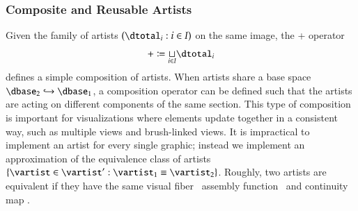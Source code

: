 \documentclass[journal]{vgtc}                %
\begin{document}
\subsubsection{Composite and Reusable Artists}
Given the family of artists $(\dtotal_i: i\in I)$ on the same image, the + operator 
\begin{equation}
+ \coloneqq \underset{i\in I}{\sqcup} \dtotal_{i}
\end{equation}
defines a simple composition of artists. When artists share a base space $\dbase_2 \hookrightarrow \dbase_1$, a composition operator can be defined such that the artists are acting on different components of the same section. This type of composition is important for visualizations where elements update together in a consistent way, such as multiple views \cite{alboRadarComparativeEvaluation2016a, hullmanKeeping2018} and brush-linked views\cite{beckerBrushingScatterplots1987,bujaInteractiveData1991}. It is impractical to implement an artist for every single graphic; instead we implement an approximation of the equivalence class of artists $\{\vartist \in \vartist^{\prime}: \vartist_{1} \equiv \vartist_{2}\}$. Roughly, two artists are equivalent if they have the same visual fiber \vfiber\, assembly function \vmark\, and continuity map \vindex. 
\end{document}

